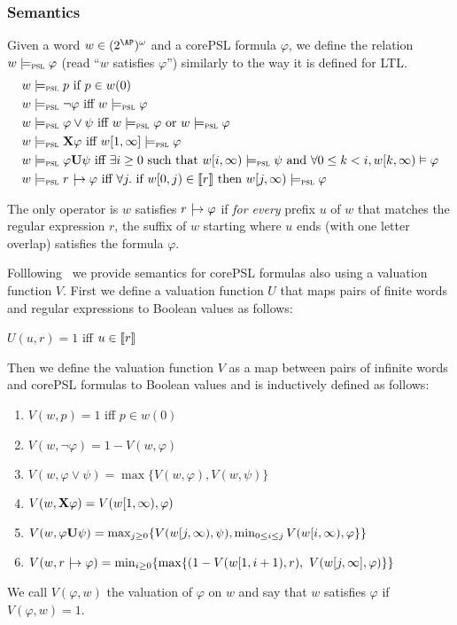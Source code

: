 \subsubsection{Semantics}
Given a word $w \in (2^{\AP})^\omega$ and a corePSL formula $\varphi$, we define the relation $w \models_\textsc{psl} \varphi$ (read ``$w$ satisfies $\varphi$'') similarly to the way it is defined for LTL. 
\begin{align*}
&w \models_\textsc{psl} p \text{ if }p \in w(0)\\
&w \models_\textsc{psl} \neg \varphi \text{ iff } w \models_\textsc{psl} \varphi\\
&w\models_\textsc{psl} \varphi \vee \psi \text{ iff } w \models_\textsc{psl} \varphi \text{ or } w \models_\textsc{psl} \varphi\\
&w \models_\textsc{psl} \textbf{X} \varphi \text{ iff } w[1,\infty] \models_\textsc{psl} \varphi\\
&w \models_\textsc{psl} \varphi \textbf{U} \psi \text{ iff }\exists i \geq 0 \text{ such that }w[i,\infty) \models_\textsc{psl} \psi \text{ and }\forall 0 \leq k < i, w[k,\infty) \vDash \varphi\\
&w  \models_\textsc{psl} r\ |\hspace{-1.8mm}\rightarrow \varphi \text{ iff } \forall j.\text{ if } w[0,j)\in{\llbracket}r{\rrbracket} \text{ then } w[j,\infty) \models_\textsc{psl} \varphi
\end{align*}

The only operator is $w$ satisfies $r\ |\hspace{-1.8mm}\rightarrow \varphi$ if \emph{for every} prefix $u$ of $w$ that matches the regular expression $r$,  the suffix of $w$ starting where $u$ ends (with one letter overlap) satisfies the formula $\varphi$.


Folllowing~\cite{DBLP:journals/corr/abs-1806-03953} we  provide semantics for corePSL formulas also using a valuation function $V$.
First we define a valuation function $U$ that maps pairs of finite words and regular expressions to Boolean values as follows:
\begin{center}
$U(u,r)=1$ iff $u\in{\llbracket}r{\rrbracket}$
\end{center}
  Then we define the valuation function $V$ as a map between pairs of infinite words and corePSL formulas to Boolean values and is inductively defined as follows:
\begin{enumerate}
	\item $V(w,p)=1$ iff $p\in w(0)$
	\item $V(w,\neg \varphi) = 1 -V(w,\varphi)$
	\item $V(w,\varphi \vee \psi)=\max\{V(w,\varphi), V(w,\psi)\}$
	\item $V(w,\textbf{X} \varphi)=V(w[1,\infty), \varphi)$
	\item $V(w,\varphi \textbf{U} \psi) = \max_{j\geq 0}\{V(w[j,\infty),\psi), \min_{0\leq i \leq j} V(w[i,\infty),\varphi \}\}$
	\item $V(w,r\triggers \varphi) = \min_{i\geq 0}\{\max \{(1-V(w[1,i+1),r),\ V(w[j,\infty],\varphi)\}\}$ 
\end{enumerate}
We call $V(\varphi,w)$ the valuation of $\varphi$ on $w$ and say that $w$ satisfies $\varphi$ if $V(\varphi, w) = 1$.



